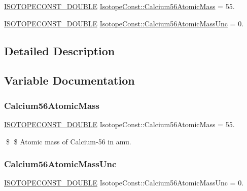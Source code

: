\begin{DoxyCompactItemize}
\item 
\mbox{\hyperlink{group___isotope_const-_macros_ga8f45a7272ce02c0b4c65c44636ed719a}{I\+S\+O\+T\+O\+P\+E\+C\+O\+N\+S\+T\+\_\+\+D\+O\+U\+B\+LE}} \mbox{\hyperlink{group___isotope_const-_calcium-_ca56_ga6bd63e8c8b7bddf9fc9e63a0c9084e10}{Isotope\+Const\+::\+Calcium56\+Atomic\+Mass}} = 55.
\item 
\mbox{\hyperlink{group___isotope_const-_macros_ga8f45a7272ce02c0b4c65c44636ed719a}{I\+S\+O\+T\+O\+P\+E\+C\+O\+N\+S\+T\+\_\+\+D\+O\+U\+B\+LE}} \mbox{\hyperlink{group___isotope_const-_calcium-_ca56_ga1b4da2ba9ad5592e0ee33b48ed9b29bf}{Isotope\+Const\+::\+Calcium56\+Atomic\+Mass\+Unc}} = 0.
\end{DoxyCompactItemize}


\subsection{Detailed Description}


\subsection{Variable Documentation}
\mbox{\label{group___isotope_const-_calcium-_ca56_ga6bd63e8c8b7bddf9fc9e63a0c9084e10}} 
\subsubsection{\texorpdfstring{Calcium56\+Atomic\+Mass}{Calcium56AtomicMass}}
{\footnotesize\ttfamily \mbox{\hyperlink{group___isotope_const-_macros_ga8f45a7272ce02c0b4c65c44636ed719a}{I\+S\+O\+T\+O\+P\+E\+C\+O\+N\+S\+T\+\_\+\+D\+O\+U\+B\+LE}} Isotope\+Const\+::\+Calcium56\+Atomic\+Mass = 55.}

\$ \$ Atomic mass of Calcium-\/56 in amu. \mbox{\label{group___isotope_const-_calcium-_ca56_ga1b4da2ba9ad5592e0ee33b48ed9b29bf}} 
\subsubsection{\texorpdfstring{Calcium56\+Atomic\+Mass\+Unc}{Calcium56AtomicMassUnc}}
{\footnotesize\ttfamily \mbox{\hyperlink{group___isotope_const-_macros_ga8f45a7272ce02c0b4c65c44636ed719a}{I\+S\+O\+T\+O\+P\+E\+C\+O\+N\+S\+T\+\_\+\+D\+O\+U\+B\+LE}} Isotope\+Const\+::\+Calcium56\+Atomic\+Mass\+Unc = 0.}

